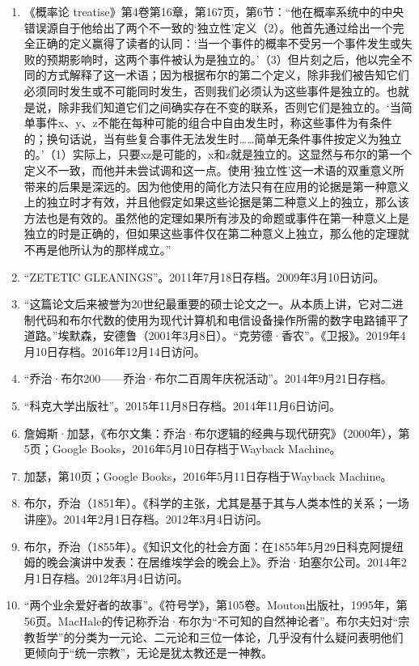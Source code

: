 \begin{enumerate}
\item 《概率论 treatise》第4卷第16章，第167页，第6节：“他在概率系统中的中央错误源自于他给出了两个不一致的‘独立性’定义（2）。他首先通过给出一个完全正确的定义赢得了读者的认同：‘当一个事件的概率不受另一个事件发生或失败的预期影响时，这两个事件被认为是独立的。’（3）但片刻之后，他以完全不同的方式解释了这一术语；因为根据布尔的第二个定义，除非我们被告知它们必须同时发生或不可能同时发生，否则我们必须认为这些事件是独立的。也就是说，除非我们知道它们之间确实存在不变的联系，否则它们是独立的。‘当简单事件x、y、z不能在每种可能的组合中自由发生时，称这些事件为有条件的；换句话说，当有些复合事件无法发生时……简单无条件事件按定义为独立的。’（1）实际上，只要xz是可能的，x和z就是独立的。这显然与布尔的第一个定义不一致，而他并未尝试调和这一点。使用‘独立性’这一术语的双重意义所带来的后果是深远的。因为他使用的简化方法只有在应用的论据是第一种意义上的独立时才有效，并且他假定如果这些论据是第二种意义上的独立，那么该方法也是有效的。虽然他的定理如果所有涉及的命题或事件在第一种意义上是独立的时是正确的，但如果这些事件仅在第二种意义上独立，那么他的定理就不再是他所认为的那样成立。”
\item “ZETETIC GLEANINGS”。2011年7月18日存档。2009年3月10日访问。
\item “这篇论文后来被誉为20世纪最重要的硕士论文之一。从本质上讲，它对二进制代码和布尔代数的使用为现代计算机和电信设备操作所需的数字电路铺平了道路。”埃默森，安德鲁（2001年3月8日）。“克劳德·香农”。《卫报》。2019年4月10日存档。2016年12月14日访问。
\item “乔治·布尔200——乔治·布尔二百周年庆祝活动”。2014年9月21日存档。
\item “科克大学出版社”。2015年11月8日存档。2014年11月6日访问。
\item 詹姆斯·加瑟，《布尔文集：乔治·布尔逻辑的经典与现代研究》（2000年），第5页；Google Books，2016年5月10日存档于Wayback Machine。
\item 加瑟，第10页；Google Books，2016年5月11日存档于Wayback Machine。
\item 布尔，乔治（1851年）。《科学的主张，尤其是基于其与人类本性的关系；一场讲座》。2014年2月1日存档。2012年3月4日访问。
\item 布尔，乔治（1855年）。《知识文化的社会方面：在1855年5月29日科克阿提纽姆的晚会演讲中发表：在居维埃学会的晚会上》。乔治·珀塞尔公司。2014年2月1日存档。2012年3月4日访问。
\item “两个业余爱好者的故事”。《符号学》，第105卷。Mouton出版社，1995年，第56页。MacHale的传记称乔治·布尔为“不可知的自然神论者”。布尔夫妇对“宗教哲学”的分类为一元论、二元论和三位一体论，几乎没有什么疑问表明他们更倾向于“统一宗教”，无论是犹太教还是一神教。

\end{enumerate}
